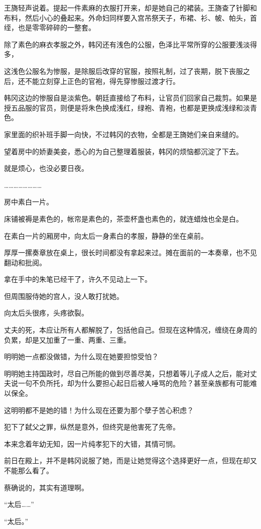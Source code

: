 王旖轻声说着。提起一件素麻的衣服打开来，却是她自己的裙装。王旖查了针脚和布料，然后小心的叠起来。外命妇同样要入宫吊祭天子，布裙、衫、帔、帕头，首绖，也是零零碎碎的一整套。

除了素色的麻衣孝服之外，韩冈还有浅色的公服，色泽比平常所穿的公服要浅淡得多，

这浅色公服名为惨服，是除服后改穿的官服，按照礼制，过了丧期，脱下丧服之后，还不能立刻穿上正色的官袍，得先穿惨服过渡才行。

韩冈这边的惨服自是淡紫色。朝廷直接给了布料，让官员们回家自己裁剪。如果是授五品服的官员，则便是将朱色换成浅红，绿袍、青袍，也都是更换成浅绿和淡青色。

家里面的织补班手脚一向快，不过韩冈的衣物，全都是王旖她们亲自来缝的。

望着房中的娇妻美妾，悉心的为自己整理着服装，韩冈的烦恼都沉淀了下去。

就是烦心，也没必要日夜。

……………………

房中素白一片。

床铺被褥是素色的，帐帘是素色的，茶壶杯盏也素色的，就连蜡烛也全是白。

在素白一片的厢房中，向太后一身素白的孝服，静静的坐在桌前。

厚厚一摞奏章放在桌上，很长时间都没有拿起来过。摊在面前的一本奏章，也不见翻动和批阅。

拿在手中的朱笔已经干了，许久不见动上一下。

但周围服侍她的宫人，没人敢打扰她。

向太后头很疼，头疼欲裂。

丈夫的死，本应让所有人都解脱了，包括他自己。但现在这种情况，缠绕在身周的负累，却是又加重了一重、两重、三重。

明明她一点都没做错，为什么现在她要担惊受怕？

明明她主持国政时，尽自己所能的做到尽善尽美，只想着等儿子成人之后，能对丈夫说一句不负所托，却为什么要担心起日后被人唾骂的危险？甚至亲族都有可能难以保全。

这明明都不是她的错！为什么现在还要为那个孽子苦心积虑？

犯下了弑父之罪，纵然是意外，但终究是他害死了先帝。

本来念着年幼无知，因一片纯孝犯下的大错，其情可悯。

前日在殿上，并不是韩冈说服了她，而是让她觉得这个选择更好一点，但现在却又不能那么看了。

蔡确说的，其实有道理啊。

“太后……”

“太后。”

